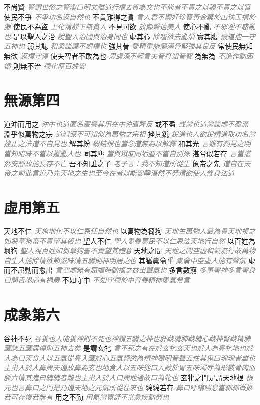 \documentclass[a4paper,zihao=-4,oneside,landscape,UTF8]{ctexart}
\newcommand{\zhushi}[1]{\scriptsize{\textit{\textcolor{gray}{#1}}}\normalsize}
\begin{document}
不尚賢
\zhushi{賢謂世俗之賢辯口明文離道行權去質為文也不尚者不貴之以祿不貴之以官}
使民不爭
\zhushi{不爭功名返自然也}
不貴難得之貨
\zhushi{言人君不禦好珍寶黃金棄於山珠玉捐於淵}
使民不為盜
\zhushi{上化清靜下無貪人}
不見可欲
\zhushi{放鄭聲遠美人}
使心不亂
\zhushi{不邪淫不惑亂也}
是以聖人之治
\zhushi{說聖人治國與治身同也}
虛其心
\zhushi{除嗜欲去亂煩}
實其腹
\zhushi{懷道抱一守五神也}
弱其誌
\zhushi{和柔謙讓不處權也}
強其骨
\zhushi{愛精重施髓滿骨堅強其良反}
常使民無知無欲
\zhushi{返樸守淳}
使夫智者不敢為也
\zhushi{思慮深不輕言夫音符知音智}
為無為
\zhushi{不造作動因循}
則無不治
\zhushi{德化厚百姓安}


\section{無源第四}

道沖而用之
\zhushi{沖中也道匿名藏譽其用在中沖直隆反}
或不盈
\zhushi{或常也道常謙虛不盈滿}
淵乎似萬物之宗
\zhushi{道淵深不可知似為萬物之宗祖}
挫其銳
\zhushi{銳進也人欲銳精進取功名當挫止之法道不自見也}
解其紛
\zhushi{紛結恨也當念道無為以解釋}
和其光
\zhushi{言雖有獨見之明當知暗昧不當以擢亂人也}
同其塵
\zhushi{當與眾庶同垢塵不當自別殊}
湛兮似若存
\zhushi{言當湛然安靜故能長存不亡}
吾不知誰之子
\zhushi{老子言：我不知道所從生}
象帝之先
\zhushi{道自在天帝之前此言道乃先天地之生也至今在者以能安靜湛然不勞煩欲使人修身法道}


\section{虛用第五}

天地不仁
\zhushi{天施地化不以仁恩任自然也}
以萬物為芻狗
\zhushi{天地生萬物人最為貴天地視之如芻草狗畜不貴望其報也}
聖人不仁
\zhushi{聖人愛養萬民不以仁恩法天地行自然}
以百姓為芻狗
\zhushi{聖人視百姓如芻草狗畜不貴望其禮意}
天地之間
\zhushi{天地之間空虛和氣流行故萬物自生人能除情欲節滋味清五臟則神明居之也}
其猶橐龠乎
\zhushi{橐龠中空虛人能有聲氣}
虛而不屈動而愈出
\zhushi{言空虛無有屈竭時動搖之益出聲氣也}
多言數窮
\zhushi{多事害神多言害身口開舌舉必有禍患}
不如守中
\zhushi{不如守德於中育養精神愛氣希言}


\section{成象第六}

谷神不死
\zhushi{谷養也人能養神則不死也神謂五臟之神也肝藏魂肺藏魄心藏神腎藏精脾藏誌五藏盡傷則五神去矣}
是謂玄牝
\zhushi{言不死之有在於玄牝玄天也於人為鼻牝地也於人為口天食人以五氣從鼻入藏於心五氣輕微為精神聰明音聲五性其鬼曰魂魂者雄也主出入於人鼻與天通故鼻為玄也地食人以五味從口入藏於胃五味濁辱為形骸骨肉血脈六情其鬼曰魄魄者雌也主出入於人口與地通故口為牝也}
玄牝之門是謂天地根
\zhushi{根元也言鼻口之門是乃通天地之元氣所從往來也}
綿綿若存
\zhushi{鼻口呼噏喘息當綿綿微妙若可存復若無有}
用之不勤
\zhushi{用氣當寬舒不當急疾勤勞也}
\end{document}
